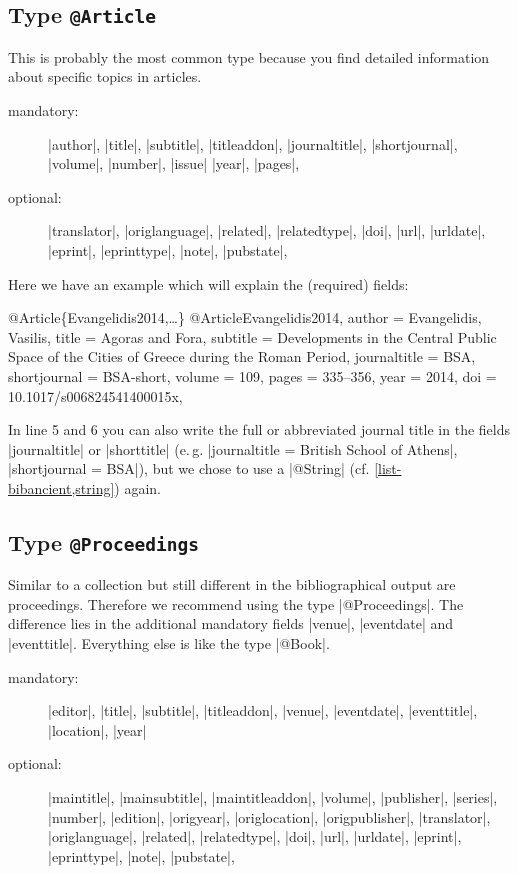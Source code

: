 \documentclass[a4paper,
10pt,
greek,
french,
spanish,
italian,
ngerman,
english
]{ltxdoc}
\begin{document}
\subsection{Type \texttt{@Article}}\label{article}
 This is probably the most common type 
because you find detailed information about specific topics in articles.

\begin{description}
\item[mandatory:] 
|author|, |title|, |subtitle|, |titleaddon|,
|journaltitle|, |shortjournal|, |volume|, |number|, |issue|
|year|, |pages|, 
\item[optional:]
|translator|, |origlanguage|,
|related|, |relatedtype|,
|doi|, |url|, |urldate|, |eprint|, |eprinttype|, |note|, |pubstate|, 
 \end{description}

Here we have an example which will explain the (required)  fields:
\begin{bibexample}[label=Evangelidis2014]{{@}Article\{Evangelidis2014,…\}}
@Article{Evangelidis2014,
  author       = {Evangelidis, Vasilis},
  title        = {Agoras {and} Fora},
  subtitle     = {Developments in the Central Public Space of the Cities of Greece during the {Roman} Period},
  journaltitle = BSA,    %
  shortjournal = BSA-short,    %
  volume       = {109},
  pages        = {335--356},
  year         = {2014},
  doi          = {10.1017/s006824541400015x},
}
\end{bibexample}
In line 5 and 6 you can also write the full or abbreviated journal title in the fields |journaltitle| or |shorttitle| (e.\,g. |journaltitle = {British School of Athens}|, |shortjournal = {BSA}|), but we chose to use a |@String| (cf. \cref{list-bibancient,string}) again.


\subsection{Type \texttt{@Proceedings}}\label{proceedings}
Similar to a collection but still different in the bibliographical output are proceedings.
Therefore we recommend  using the type |@Proceedings|.
The difference lies in the additional mandatory fields |venue|, |eventdate| and |eventtitle|. 
Everything else is like the type |@Book|.

\begin{description}
\item[mandatory:] 
|editor|, 
|title|, |subtitle|, |titleaddon|,
|venue|, |eventdate|, |eventtitle|,
|location|, |year|
\item[optional:]
|maintitle|, |mainsubtitle|, |maintitleaddon|, |volume|, 
|publisher|, |series|, |number|, |edition|, 
|origyear|, |origlocation|, |origpublisher|, 
|translator|, |origlanguage|,
|related|, |relatedtype|,
|doi|, |url|, |urldate|, |eprint|, |eprinttype|, |note|, |pubstate|, 
 \end{description}
 
\end{document}
